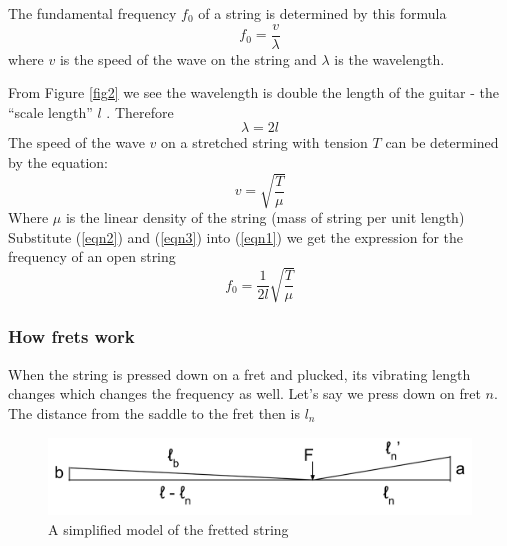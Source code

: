 \documentclass[11pt]{article}
\begin{document}
\begin{flushleft}
                The fundamental frequency $f_0$ of a string is determined by this formula
                \begin{equation}\label{eqn1}
                    f_0 = \frac{v}{\lambda}
                \end{equation}
                where $v$ is the speed of the wave on the string and $\lambda$ is the wavelength. 

                From Figure \ref{fig2} we see the wavelength is double the length of the guitar - the “scale length” $l$ . Therefore \begin{equation}\label{eqn2}
                    \lambda = 2l
                \end{equation}
                The speed of the wave $v$ on a stretched string with tension $T$ can be determined by the equation:
                \begin{equation}\label{eqn3}
                    v = \sqrt{\frac{T}{\mu}} 
                \end{equation}
                Where $\mu$ is the linear density of the string (mass of string per unit length)
                Substitute (\ref{eqn2}) and (\ref{eqn3}) into (\ref{eqn1}) we get the expression for the frequency of an open string
                \begin{equation}\label{eqn4}
                    f_0 = \frac{1}{2l}\sqrt{\frac{T}{\mu}}
                \end{equation}

            \subsubsection*{How frets work}
                When the string is pressed down on a fret and plucked, its vibrating length changes which  changes the frequency as well.
                Let's say we press down on fret $n$. The distance from the saddle to the fret then is $l_n$
                
                \begin{figure}[!ht]
                    \includegraphics[width=\textwidth]{fig3.png}
                    \caption{A simplified model of the fretted string}\label{fig3}
                \end{figure} 


\end{flushleft}
\end{document}
